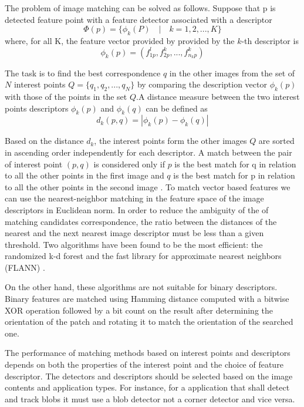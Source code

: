 \documentclass[9pt,shortpaper,twoside,web]{ieeecolor}
\begin{document}
The problem of image matching can be solved as follows. Suppose that p is detected feature point with a feature detector associated with a descriptor
\begin{equation}
\label{eq11}
\Phi (p) = \{\phi_k(P) \quad | \quad  k = 1, 2, ..., K \} 
\end{equation}
where, for all K, the feature vector provided by provided by the $k$-th descriptor is
\begin{equation}
\label{eq12}
\phi_k(p) = (f_{1p}^l, f_{2p}^k, ..., f_{n_kp}^k)
\end{equation}

The task is to find the best correspondence $q$ in the other images from the set of $N$ interest points $Q = \{q_1, q_2, ..., q_N\} $ by comparing the description vector $\phi_k(p)$ with those of the points in the set $Q$.A distance measure between the two interest points descriptors $\phi_k(p)$ and $\phi_k(q)$ can be defined as
\begin{equation}
\label{eq13}
d_k(p,q) = |\phi_k(p) - \phi_k(q)|
\end{equation}

Based on the distance $d_k$, the interest points form the other images $Q$ are sorted in ascending order independently for each descriptor. A match between the pair of interest point $(p,q)$ is considered only if $p$ is the best match for q in relation to all the other points in the first image and $q$ is the best match for p in relation to all the other points in the second image \cite{b2}. To match vector based features we can use the nearest-neighbor matching in the feature space of the image descriptors in Euclidean norm. In order to reduce the ambiguity of the of matching candidates correspondence, the ratio between the distances of the nearest and the next nearest image descriptor must be less than a given threshold. Two algorithms have been found to be the most efficient: the randomized k-d forest and the fast library for approximate nearest neighbors (FLANN) \cite{b2}.

On the other hand, these algorithms are not suitable for binary descriptors. Binary features are matched using Hamming distance computed with a bitwise XOR operation followed by a bit count on the result after determining the orientation of the patch and rotating it to match the orientation of the searched one.

The performance of matching methods based on interest points and descriptors depends on both the properties of the interest point and the choice of feature descriptor. The detectors and descriptors should be selected based on the image contents and application types. For instance, for a application that shall detect and track blobs it must use a blob detector not a corner detector and vice versa.
\end{document}
